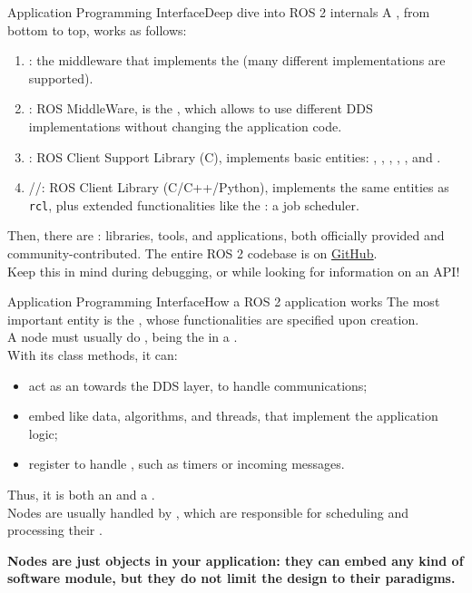 \begin{frame}{Application Programming Interface}{Deep dive into ROS 2 internals}
	A , from bottom to top, works as follows:
	\begin{enumerate}
		\item {}: the middleware that implements the  (many different implementations are supported).
		\item {}: ROS MiddleWare, is the , which allows to use different DDS implementations without changing the application code.
		\item {}: ROS Client Support Library (C), implements basic entities: , , , , , and .
		\item {}//: ROS Client Library (C/C++/Python), implements the same entities as \texttt{rcl}, plus extended functionalities like the : a job scheduler.
	\end{enumerate}
	Then, there are : libraries, tools, and applications, both officially provided and community-contributed. The entire ROS 2 codebase is on \href{https://github.com/ros2}{\color{blue}\underline{GitHub}}.\\
  Keep this in mind during debugging, or while looking for information on an API!
\end{frame}
\begin{frame}{Application Programming Interface}{How a ROS 2 application works}
	The most important entity is the , whose functionalities are specified upon creation.\\
	A node must usually do , being the  in a .\\
	With its class methods, it can:
	\begin{itemize}
		\item act as an  towards the DDS layer, to handle communications;
		\item embed  like data, algorithms, and threads, that implement the application logic;
		\item register  to handle , such as timers or incoming messages.
	\end{itemize}
	Thus, it is both an  and a .\\
	Nodes are usually handled by , which are responsible for scheduling and processing their .
	\begin{block}{}
		\centering
		\textbf{Nodes are just objects in your application: they can embed any kind of software module, but they do not limit the design to their paradigms.}
	\end{block}
\end{frame}

